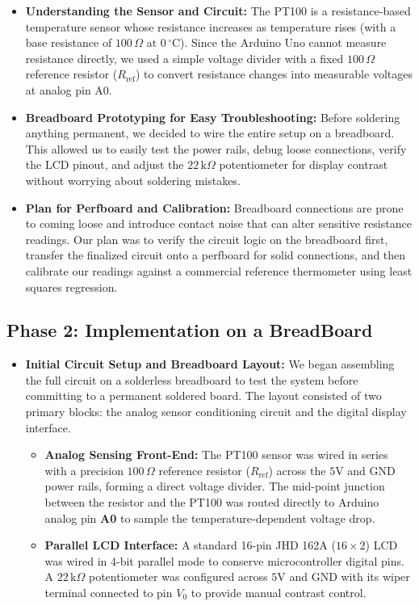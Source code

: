\documentclass[journal,12pt,onecolumn]{IEEEtran}
\begin{document}
\begin{enumerate}
\begin{itemize}
	\item \textbf{Understanding the Sensor and Circuit:} The PT100 is a resistance-based temperature sensor whose resistance increases as temperature rises (with a base resistance of $100\,\Omega$ at $0\,^\circ\text{C}$). Since the Arduino Uno cannot measure resistance directly, we used a simple voltage divider with a fixed $100\,\Omega$ reference resistor ($R_{\text{ref}}$) to convert resistance changes into measurable voltages at analog pin A0.
	
	\item \textbf{Breadboard Prototyping for Easy Troubleshooting:} Before soldering anything permanent, we decided to wire the entire setup on a breadboard. This allowed us to easily test the power rails, debug loose connections, verify the LCD pinout, and adjust the $22\,\text{k}\Omega$ potentiometer for display contrast without worrying about soldering mistakes.
	
	\item \textbf{Plan for Perfboard and Calibration:} Breadboard connections are prone to coming loose and introduce contact noise that can alter sensitive resistance readings. Our plan was to verify the circuit logic on the breadboard first, transfer the finalized circuit onto a perfboard for solid connections, and then calibrate our readings against a commercial reference thermometer using least squares regression.
\end{itemize}
\newpage

\subsection*{\textbf{Phase 2}: Implementation on a BreadBoard}

\begin{itemize}
	\item \textbf{Initial Circuit Setup and Breadboard Layout:} We began assembling the full circuit on a solderless breadboard to test the system before committing to a permanent soldered board. The layout consisted of two primary blocks: the analog sensor conditioning circuit and the digital display interface.
	\begin{itemize}
		\item \textbf{Analog Sensing Front-End:} The PT100 sensor was wired in series with a precision $100\,\Omega$ reference resistor ($R_{\text{ref}}$) across the $5\text{V}$ and $\text{GND}$ power rails, forming a direct voltage divider. The mid-point junction between the resistor and the PT100 was routed directly to Arduino analog pin \textbf{A0} to sample the temperature-dependent voltage drop.
		\item \textbf{Parallel LCD Interface:} A standard 16-pin JHD 162A ($16\times2$) LCD was wired in 4-bit parallel mode to conserve microcontroller digital pins. A $22\,\text{k}\Omega$ potentiometer was configured across $5\text{V}$ and $\text{GND}$ with its wiper terminal connected to pin $V_0$ to provide manual contrast control.
	\end{itemize}
\end{itemize}


\end{enumerate}
\end{document}
